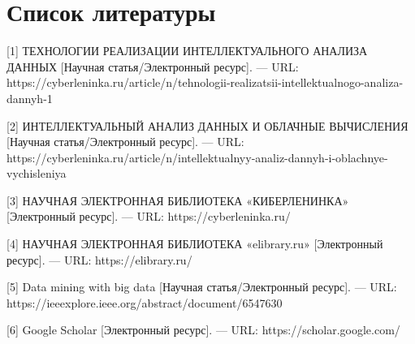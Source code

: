 \documentclass[14pt,a4paper,report]{report}
\begin{document}
\clearpage

\section{Список литературы}

\begin{flushleft}

[1] ТЕХНОЛОГИИ РЕАЛИЗАЦИИ ИНТЕЛЛЕКТУАЛЬНОГО АНАЛИЗА ДАННЫХ [Научная статья/Электронный ресурс]. — URL: https://cyberleninka.ru/article/n/tehnologii-realizatsii-intellektualnogo-analiza-dannyh-1

[2] ИНТЕЛЛЕКТУАЛЬНЫЙ АНАЛИЗ ДАННЫХ И ОБЛАЧНЫЕ ВЫЧИСЛЕНИЯ [Научная статья/Электронный ресурс]. — URL: https://cyberleninka.ru/article/n/intellektualnyy-analiz-dannyh-i-oblachnye-vychisleniya

[3] НАУЧНАЯ ЭЛЕКТРОННАЯ БИБЛИОТЕКА «КИБЕРЛЕНИНКА» [Электронный ресурс]. — URL: https://cyberleninka.ru/

[4] НАУЧНАЯ ЭЛЕКТРОННАЯ БИБЛИОТЕКА «elibrary.ru» [Электронный ресурс]. — URL: https://elibrary.ru/

[5] Data mining with big data [Научная статья/Электронный ресурс]. — URL: https://ieeexplore.ieee.org/abstract/document/6547630

[6] Google Scholar [Электронный ресурс]. — URL: https://scholar.google.com/

\end{flushleft}
	
\end{document}
